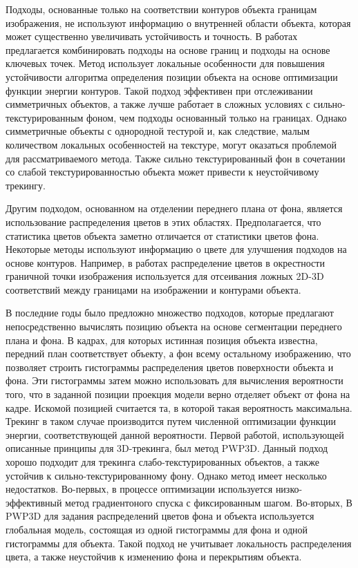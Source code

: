 Подходы, основанные только на соответствии контуров объекта границам
изображения,
не используют информацию о внутренней области объекта, которая может существенно
увеличивать устойчивость и точность. В работах
\cite{VacchettiEdges2004,ChoiFeaturesAndEdges,Bugaev_2018_ECCV} предлагается
комбинировать подходы на основе границ и подходы на основе ключевых точек. Метод
\cite{Bugaev_2018_ECCV} использует локальные особенности для повышения
устойчивости алгоритма определения позиции объекта на основе оптимизации функции
энергии контуров. Такой подход эффективен при отслеживании симметричных
объектов, а также лучше работает в сложных условиях с сильно-текстурированным
фоном, чем подходы основанный только на границах. Однако симметричные объекты с
однородной тестурой и, как следствие, малым количеством локальных особенностей
на текстуре, могут оказаться проблемой для рассматриваемого метода. Также сильно
текстурированный фон в сочетании со слабой текстурированностью объекта может
привести к неустойчивому трекингу.

Другим подходом, основанном на отделении переднего плана от фона,
является использование распределения цветов в этих областях. Предполагается, что
статистика цветов объекта заметно отличается от статистики цветов фона.
Некоторые методы \cite{SeoHinterstoisser2014,WangZhong2015,Zhong2018} используют
информацию о цвете для улучшения подходов на основе контуров. Например, в
работах \cite{SeoHinterstoisser2014,WangZhong2015} распределение цветов в
окрестности граничной точки изображения используется для отсеивания ложных 2D-3D
соответствий между границами на изображении и контурами объекта.

В последние годы было предложно множество подходов, которые предлагают
непосредственно вычислять позицию объекта на основе сегментации переднего плана
и фона. В кадрах, для которых истинная позиция объекта известна, передний план
соответствует объекту, а фон всему остальному изображению, что позволяет
строить гистограммы распределения цветов поверхности объекта и фона.
Эти гистограммы затем можно использовать для вычисления вероятности того, что в
заданной позиции проекция модели верно отделяет объект от фона на кадре.
Искомой позицией считается та, в которой такая вероятность максимальна.
Трекинг в таком случае производится путем численной оптимизации функции
энергии, соответствующей данной вероятности.
Первой работой, использующей описанные принципы для 3D-трекинга,
был метод PWP3D\cite{PWP3D}. Данный подход хорошо подходит для трекинга
слабо-текстурированных объектов, а также устойчив к сильно-текстурированному
фону. Однако метод имеет несколько недостатков.
Во-первых, в процессе оптимизации используется низко-эффективный метод
градиентоного спуска с фиксированным шагом. Во-вторых, В PWP3D для задания
распределений цветов фона и объекта используется глобальная модель, состоящая из
одной гистограммы для фона и одной гистограммы для объекта. Такой подход не
учитывает локальность распределения цвета, а также неустойчив к изменению фона и
перекрытиям объекта.

